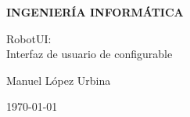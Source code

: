 \begin{titlepage}
\begin{center}
    \Large{\textbf{INGENIERÍA INFORMÁTICA}} \\

    \vspace{3.0cm}

    \Large{RobotUI:\\ Interfaz de usuario de configurable} \\

    \vspace{2.0cm}

    \Large{Manuel López Urbina} \\

    \vspace{0.5cm}

    \large{\today}

  \end{center}
\end{titlepage}
